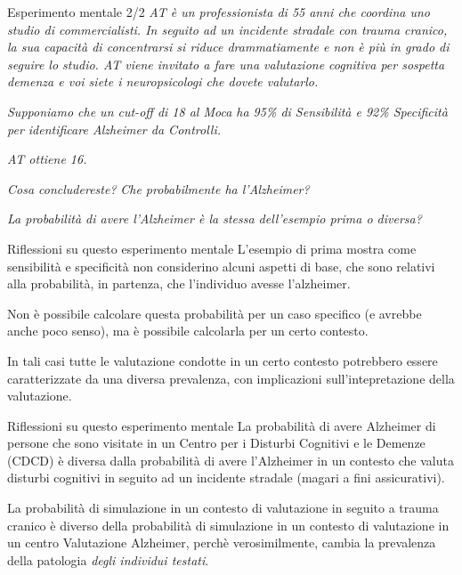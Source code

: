 \documentclass[
  ignorenonframetext,
]{beamer}
\begin{document}
\begin{frame}{Esperimento mentale 2/2}
\label{esperimento-mentale-22}
\emph{AT è un professionista di 55 anni che coordina uno studio di
commercialisti. In seguito ad un incidente stradale con trauma cranico,
la sua capacità di concentrarsi si riduce drammatiamente e non è più in
grado di seguire lo studio. AT viene invitato a fare una valutazione
cognitiva per sospetta demenza e voi siete i neuropsicologi che dovete
valutarlo.}

\emph{Supponiamo che un cut-off di 18 al Moca ha 95\% di Sensibilità e
92\% Specificità per identificare Alzheimer da Controlli.}

\pause

\emph{AT ottiene 16.}

\emph{Cosa concludereste?} \pause \emph{Che probabilmente ha
l'Alzheimer?} \pause

\emph{La probabilità di avere l'Alzheimer è la stessa dell'esempio prima
o diversa?}
\end{frame}

\begin{frame}{Riflessioni su questo esperimento mentale}
\label{riflessioni-su-questo-esperimento-mentale}
L'esempio di prima mostra come sensibilità e specificità non considerino
alcuni aspetti di base, che sono relativi alla probabilità, in partenza,
che l'individuo avesse l'alzheimer.

Non è possibile calcolare questa probabilità per un caso specifico (e
avrebbe anche poco senso), ma è possibile calcolarla per un certo
contesto.

In tali casi tutte le valutazione condotte in un certo contesto
potrebbero essere caratterizzate da una diversa prevalenza, con
implicazioni sull'intepretazione della valutazione.
\end{frame}

\begin{frame}{Riflessioni su questo esperimento mentale}
\label{riflessioni-su-questo-esperimento-mentale-1}
La probabilità di avere Alzheimer di persone che sono visitate in un
Centro per i Disturbi Cognitivi e le Demenze (CDCD) è diversa dalla
probabilità di avere l'Alzheimer in un contesto che valuta disturbi
cognitivi in seguito ad un incidente stradale (magari a fini
assicurativi).

La probabilità di simulazione in un contesto di valutazione in seguito a
trauma cranico è diverso della probabilità di simulazione in un contesto
di valutazione in un centro Valutazione Alzheimer, perchè
verosimilmente, cambia la prevalenza della patologia \emph{degli
individui testati}.
\end{frame}
\end{document}
